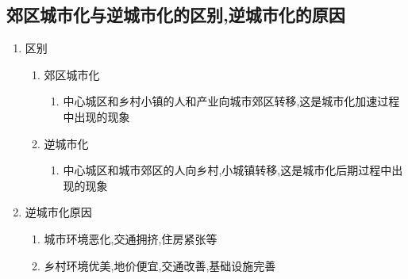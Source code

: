 \documentclass[a4paper]{article}
\begin{document}
    \subsection{郊区城市化与逆城市化的区别,逆城市化的原因}
    \begin{enumerate}
        \item 区别
        \begin{enumerate}
            \item 郊区城市化
            \begin{enumerate}
                \item 中心城区和乡村小镇的人和产业向城市郊区转移,这是城市化加速过程中出现的现象
            \end{enumerate}
            \item 逆城市化
            \begin{enumerate}
                \item 中心城区和城市郊区的人向乡村,小城镇转移,这是城市化后期过程中出现的现象
            \end{enumerate}
        \end{enumerate}
        \item 逆城市化原因
        \begin{enumerate}
            \item 城市环境恶化,交通拥挤,住房紧张等
            \item 乡村环境优美,地价便宜,交通改善,基础设施完善
        \end{enumerate}
    \end{enumerate}
\end{document}
